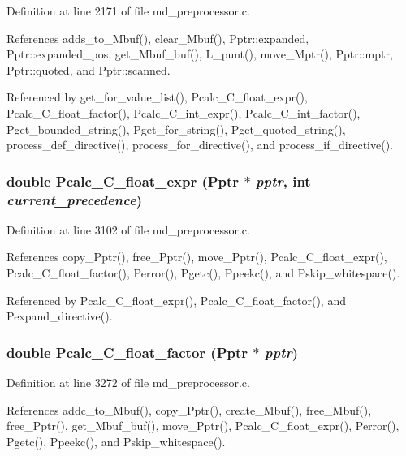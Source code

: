 Definition at line 2171 of file md\_\-preprocessor.c.

References adds\_\-to\_\-Mbuf(), clear\_\-Mbuf(), Pptr::expanded, Pptr::expanded\_\-pos, get\_\-Mbuf\_\-buf(), L\_\-punt(), move\_\-Mptr(), Pptr::mptr, Pptr::quoted, and Pptr::scanned.

Referenced by get\_\-for\_\-value\_\-list(), Pcalc\_\-C\_\-float\_\-expr(), Pcalc\_\-C\_\-float\_\-factor(), Pcalc\_\-C\_\-int\_\-expr(), Pcalc\_\-C\_\-int\_\-factor(), Pget\_\-bounded\_\-string(), Pget\_\-for\_\-string(), Pget\_\-quoted\_\-string(), process\_\-def\_\-directive(), process\_\-for\_\-directive(), and process\_\-if\_\-directive().
\subsubsection{\setlength{\rightskip}{0pt plus 5cm}double Pcalc\_\-C\_\-float\_\-expr (\bf{Pptr} $\ast$ {\em pptr}, int {\em current\_\-precedence})}\label{md__preprocessor_8c_9f2325391833230381496bb431bd6787}




Definition at line 3102 of file md\_\-preprocessor.c.

References copy\_\-Pptr(), free\_\-Pptr(), move\_\-Pptr(), Pcalc\_\-C\_\-float\_\-expr(), Pcalc\_\-C\_\-float\_\-factor(), Perror(), Pgetc(), Ppeekc(), and Pskip\_\-whitespace().

Referenced by Pcalc\_\-C\_\-float\_\-expr(), Pcalc\_\-C\_\-float\_\-factor(), and Pexpand\_\-directive().
\subsubsection{\setlength{\rightskip}{0pt plus 5cm}double Pcalc\_\-C\_\-float\_\-factor (\bf{Pptr} $\ast$ {\em pptr})}\label{md__preprocessor_8c_d5d57d0445efaf105fc993c973500e88}




Definition at line 3272 of file md\_\-preprocessor.c.

References addc\_\-to\_\-Mbuf(), copy\_\-Pptr(), create\_\-Mbuf(), free\_\-Mbuf(), free\_\-Pptr(), get\_\-Mbuf\_\-buf(), move\_\-Pptr(), Pcalc\_\-C\_\-float\_\-expr(), Perror(), Pgetc(), Ppeekc(), and Pskip\_\-whitespace().

